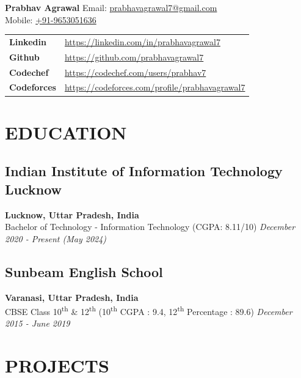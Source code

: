 \documentclass[12pt]{article}
\begin{document}
\begin{table}[h]
	{\LARGE\bfseries Prabhav Agrawal} \hfill Email: \href{mailto:prabhavagrawal7@gmail.com}{prabhavagrawal7@gmail.com}\\
	\hfill Mobile: \href{tel:+919653051636}{+91-9653051636}    \\ 
	\centering
	\begin{tabularx}{\textwidth}{@{}ll}
		\small \textbf{Linkedin} & \url{https://linkedin.com/in/prabhavagrawal7}\\
		\small \textbf{Github} & \url{https://github.com/prabhavagrawal7}\\
		\small \textbf{Codechef} & \url{https://codechef.com/users/prabhav7}\\
		\small \textbf{Codeforces} & \url{https://codeforces.com/profile/prabhavagrawal7}\\
	\end{tabularx}
\end{table}
\vspace{-\topsep}
\vspace*{-5pt}
\section*{EDUCATION}
\subsection*{Indian Institute of Information Technology Lucknow}	\hfill\textbf{Lucknow, Uttar Pradesh, India} \\
\small Bachelor of Technology - Information Technology (CGPA: 8.11/10) 	\hfill\textit{December 2020 - Present (May 2024)} \\
\subsection*{Sunbeam English School}	\hfill\textbf{Varanasi, Uttar Pradesh, India} \\
CBSE Class 10\textsuperscript{th} \& 12\textsuperscript{th} (10\textsuperscript{th} CGPA : 9.4, 12\textsuperscript{th} Percentage : 89.6) \hfill \textit{December 2015 - June 2019} \\

\section*{PROJECTS}
\end{document}
